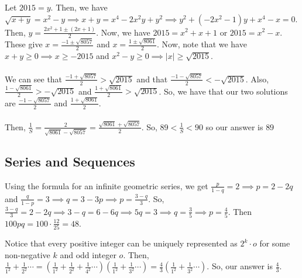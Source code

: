 \documentclass[11pt]{article}
\begin{document}
\begin{sol}
Let $2015=y$. Then, we have $\sqrt{x+y}=x^2-y\implies x+y=x^4-2x^2y+y^2\implies y^2+(-2x^2-1)y+x^4-x=0$. Then, $y=\frac{2x^2+1 \pm (2x+1)}{2}$. Now, we have $2015=x^2+x+1$ or $2015=x^2-x$. These give $x=\frac{-1 \pm \sqrt{8057}}{2}$ and $x=\frac{1 \pm \sqrt{8061}}{2}$. Now, note that we have $x+y\ge 0 \implies x \ge -2015$ and $x^2-y\ge 0\implies |x|\ge \sqrt{2015}$. \\
\\
We can see that $\frac{-1 + \sqrt{8057}}{2}>\sqrt{2015}$ and that $\frac{-1-\sqrt{8057}}{2} < -\sqrt{2015}$. Also, $\frac{1-\sqrt{8061}}{2} > - \sqrt{2015}$ and $\frac{1+\sqrt{8061}}{2} > \sqrt{2015}$. So, we have that our two solutions are $\frac{-1-\sqrt{8057}}{2}$ and $\frac{1+\sqrt{8061}}{2}$. \\
\\
Then, $\frac{1}{S}=\frac{2}{\sqrt{8061}-\sqrt{8057}}=\frac{\sqrt{8061}+\sqrt{8057}}{2}$. So, $89 < \frac{1}{S} < 90$ so our answer is $\boxed{89}$
\end{sol}

\subsection{Series and Sequences}

\begin{sol}
Using the formula for an infinite geometric series, we get $\frac{p}{1-q}=2\implies p=2-2q$ and $\frac{q}{1-p}=3\implies q=3-3p\implies p=\frac{3-q}{3}$. So, $\frac{3-q}{3}=2-2q\implies 3-q=6-6q\implies 5q=3\implies q =\frac{3}{5}\implies p =\frac{4}{5}$. Then $100pq=100\cdot \frac{12}{25}=\boxed{48}$.
\end{sol}


\begin{sol}
Notice that every positive integer can be uniquely represented as $2^{k}\cdot o$ for some non-negative $k$ and odd integer $o$. Then, $\frac{1}{1^2}+\frac{1}{2^2}\cdots = (\frac{1}{1^2}+\frac{1}{2^2}+\frac{1}{4^2}\cdots)(\frac{1}{1^2}+\frac{1}{3^2}\cdots) = \frac{4}{3}(\frac{1}{1^2} + \frac{1}{3^2}\cdots)$. So, our answer is $\boxed{\frac{4}{3}}$.
\end{sol}
\end{document}
